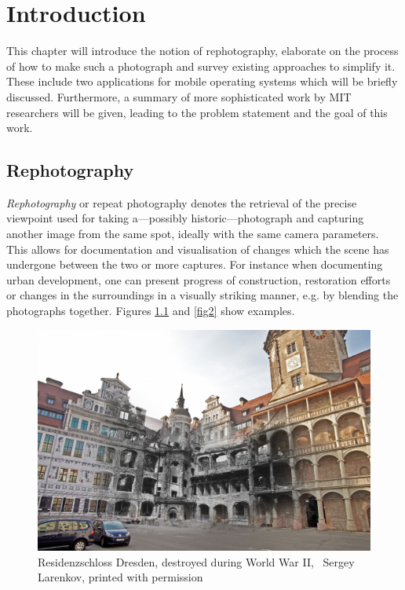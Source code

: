 \chapter{Introduction}

This chapter will introduce the notion of rephotography, elaborate on the
process of how to make such a photograph and survey existing approaches to
simplify it. These include two applications for mobile operating systems which
will be briefly discussed. Furthermore, a summary of more sophisticated work by
MIT researchers will be given, leading to the problem statement and the goal of
this work.

\section{Rephotography}

\emph{Rephotography} or repeat photography denotes the retrieval of the precise
viewpoint used for taking a---possibly historic---photograph and capturing
another image from the same spot, ideally with the same camera parameters. This
allows for documentation and visualisation of changes which the scene has
undergone between the two or more captures.  For instance when documenting urban
development, one can present progress of construction, restoration efforts or
changes in the surroundings in a visually striking manner, e.g. by blending the
photographs together.  Figures \ref{fig1} and \ref{fig2} show examples.

\begin{figure}
   \includegraphics[width=\textwidth]{gfx/1945_2014_Residenzschloss_small.jpg}
   \caption[Residenzschloss Dresden]{Residenzschloss Dresden, destroyed during World War II,
   \textcopyright\ Sergey Larenkov, printed with permission}
   \label{fig1}
\end{figure}

